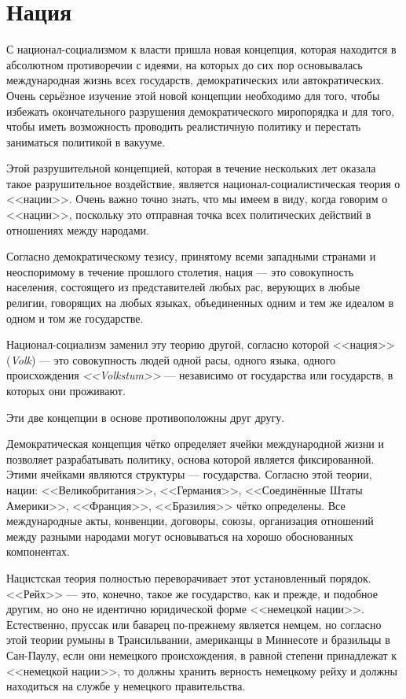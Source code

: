 \chapter{Нация}

С национал-социализмом к власти пришла новая концепция, которая находится в абсолютном противоречии с идеями, на которых до сих пор основывалась международная жизнь всех государств, демократических или автократических. Очень серьёзное изучение этой новой концепции необходимо для того, чтобы избежать окончательного разрушения демократического миропорядка и для того, чтобы иметь возможность проводить реалистичную политику и перестать заниматься политикой в вакууме.
 
Этой разрушительной концепцией, которая в течение нескольких лет оказала такое разрушительное воздействие, является национал-социалистическая теория о <<нации>>. Очень важно точно знать, что мы имеем в виду, когда говорим о <<нации>>, поскольку это отправная точка всех политических действий в отношениях между народами.

Согласно демократическому тезису, принятому всеми западными странами и неоспоримому в течение прошлого столетия, нация — это совокупность населения, состоящего из представителей любых рас, верующих в любые религии, говорящих на любых языках, объединенных одним и тем же идеалом в одном и том же государстве.

\sloppy Национал-социализм заменил эту теорию другой, согласно которой <<нация>> (\textit{Volk}) — это совокупность людей одной расы, одного языка, одного происхождения \textit{<<Volkstum>>} — независимо от государства или государств, в которых они проживают.

Эти две концепции в основе противоположны друг другу.

Демократическая концепция чётко определяет ячейки международной жизни и позволяет разрабатывать политику, основа которой является фиксированной. Этими ячейками являются структуры — государства. Согласно этой теории, нации: <<Великобритания>>, <<Германия>>, <<Соединённые Штаты Америки>>, <<Франция>>, <<Бразилия>> чётко определены. Все международные акты, конвенции, договоры, союзы, организация отношений между разными народами могут основываться на хорошо обоснованных компонентах.

\sloppy Нацистская теория полностью переворачивает этот установленный порядок. <<Рейх>> — это, конечно, такое же государство, как и прежде, и подобное другим, но оно не идентично юридической форме <<немецкой нации>>. Естественно, пруссак или баварец по-прежнему является немцем, но согласно этой теории румыны в Трансильвании, американцы в Миннесоте и бразильцы в Сан-Паулу, если они немецкого происхождения, в равной степени принадлежат к <<немецкой нации>>, то должны хранить верность немецкому рейху и должны находиться на службе у немецкого правительства.

